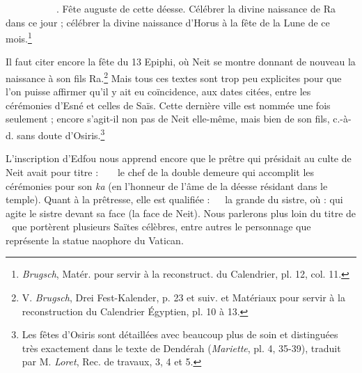 \documentclass[a4paper, 11pt, oneside]{article}
\newcommand*\hieroglyhicsAABA{}
\newcommand*\hieroglyhicsAACL{\raisebox{0.5ex}{}}
\newcommand*\hieroglyhicsAACS{}
\newcommand*\hieroglyhicsAACY{}
\newcommand*\hieroglyhicsAADV{\raisebox{0.5ex}{}}
\newcommand*\hieroglyhicsAAEK{}
\newcommand*\hieroglyhicsAAHK{}
\newcommand*\hieroglyhicsAAII{}
\newcommand*\hieroglyhicsAAJS{\raisebox{0.5ex}{}}
\newcommand*\hieroglyhicsAAMR{\raisebox{0.5ex}{}}
\newcommand*\hieroglyhicsAANC{}
\newcommand*\hieroglyhicsAANP{}
\newcommand*\hieroglyhicsAAOG{}
\newcommand*\hieroglyhicsAAOH{}
\newcommand*\hieroglyhicsAAOI{}
\newcommand*\hieroglyhicsAAOJ{}
\newcommand*\hieroglyhicsAAOK{}
\newcommand*\hieroglyhicsAAOL{}
\newcommand*\hieroglyhicsAAOM{}
\newcommand*\hieroglyhicsAAON{}
\newcommand*\hieroglyhicsAAOO{}
\newcommand*\hieroglyhicsAAOP{}
\newcommand*\hieroglyhicsAAOQ{}
\newcommand*\hieroglyhicsAAOR{}
\newcommand*\hieroglyhicsAAOS{}
\newcommand*\hieroglyhicsAAOT{}
\newcommand*\hieroglyhicsAAOU{}
\newcommand*\hieroglyhicsAAOV{}
\newcommand*\hieroglyhicsAAOW{}
\newcommand*\hieroglyhicsAAOX{}
\newcommand*\hieroglyhicsAAOY{\raisebox{0.3ex}{}}
\begin{document}
$\hieroglyhicsAAJS\:\hieroglyhicsAAOG\:\hieroglyhicsAAEK\allowbreak\:\hieroglyhicsAAII\:\hieroglyhicsAAOH\:\hieroglyhicsAAMR\allowbreak\:\hieroglyhicsAAEK\:\hieroglyhicsAANC\:\hieroglyhicsAAOI\allowbreak\:\hieroglyhicsAACL\:\hieroglyhicsAAOJ\:\hieroglyhicsAANP\allowbreak\:\hieroglyhicsAAOK\:\hieroglyhicsAAOL\:\hieroglyhicsAAMR\:\hieroglyhicsAAEK\allowbreak\:\hieroglyhicsAANC\:\hieroglyhicsAAOM\:\hieroglyhicsAAON\allowbreak\:\hieroglyhicsAADV\:\hieroglyhicsAAOO\:\hieroglyhicsAAOP\allowbreak\:\hieroglyhicsAAOO\:\hieroglyhicsAAOQ$. Fête auguste de cette déesse. Célébrer la divine naissance de Ra dans ce jour ; célébrer la divine naissance d'Horus à la fête de la Lune de ce mois.\footnote{\emph{Brugsch}, Matér. pour servir à la reconstruct. du Calendrier, pl. 12, col. 11.}

Il faut citer encore la fête du 13 Epiphi, où Neit se montre donnant de nouveau la naissance à son fils Ra.\footnote{V. \emph{Brugsch}, Drei Fest-Kalender, p. 23 et suiv. et Matériaux pour servir à la reconstruction du Calendrier Égyptien, pl. 10 à 13.} Mais tous ces textes sont trop peu explicites pour que l'on puisse affirmer qu'il y ait eu coïncidence, aux dates citées, entre les cérémonies d'Esné et celles de Saïs. Cette dernière ville est nommée une fois seulement ; encore s'agit-il non pas de Neit elle-même, mais bien de son fils, c.-à-d. sans doute d'Osiris.\footnote{Les fêtes d'Osiris sont détaillées avec beaucoup plus de soin et distinguées très exactement dans le texte de Dendérah (\emph{Mariette}, pl. 4, 35-39), traduit par M. \emph{Loret}, Rec. de travaux, 3, 4 et 5.}

L'inscription d'Edfou nous apprend encore que le prêtre qui présidait au culte de Neit avait pour titre : $\hieroglyhicsAAHK\:\hieroglyhicsAAOR\:\hieroglyhicsAAHK\allowbreak\:\hieroglyhicsAAOS\:\hieroglyhicsAAOT\allowbreak\:\hieroglyhicsAAOU\:\hieroglyhicsAACS$ le chef de la double demeure qui accomplit les cérémonies pour son \emph{ka} (en l'honneur de l'âme de la déesse résidant dans le temple). Quant à la prêtresse, elle est qualifiée : $\hieroglyhicsAABA\:\hieroglyhicsAACY\:\hieroglyhicsAAOV\allowbreak\:\hieroglyhicsAANP\:\hieroglyhicsAAOW$ la grande du sistre, où : qui agite le sistre devant sa face (la face de Neit). Nous parlerons plus loin du titre de $\hieroglyhicsAAOX\:\hieroglyhicsAAOY$ que portèrent plusieurs Saïtes célèbres, entre autres le personnage que représente la statue naophore du Vatican.
\end{document}
